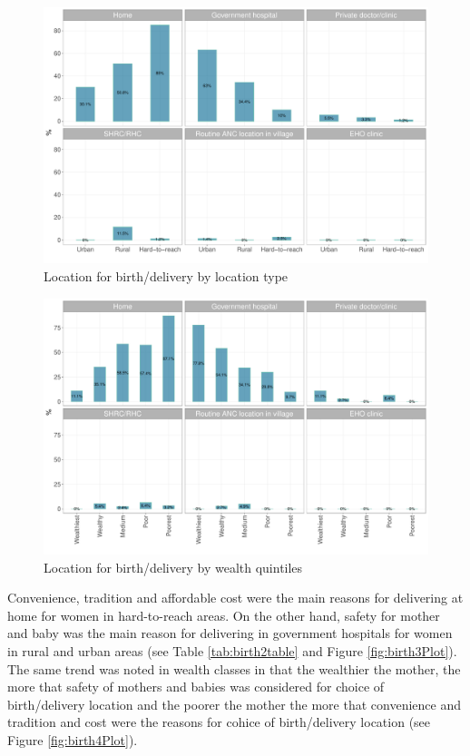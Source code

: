 \documentclass[12pt,a4paper]{article}
\begin{document}
\begin{figure}[H]

{\centering \includegraphics{kayinReport_files/figure-latex/birth1Plot-1} 

}

\caption{Location for birth/delivery by location type}\label{fig:birth1Plot}
\end{figure}

\begin{figure}[H]

{\centering \includegraphics{kayinReport_files/figure-latex/birth2Plot-1} 

}

\caption{Location for birth/delivery by wealth quintiles}\label{fig:birth2Plot}
\end{figure}

Convenience, tradition and affordable cost were the main reasons for delivering at home for women in hard-to-reach areas. On the other hand, safety for mother and baby was the main reason for delivering in government hospitals for women in rural and urban areas (see Table \ref{tab:birth2table} and Figure \ref{fig:birth3Plot}). The same trend was noted in wealth classes in that the wealthier the mother, the more that safety of mothers and babies was considered for choice of birth/delivery location and the poorer the mother the more that convenience and tradition and cost were the reasons for cohice of birth/delivery location (see Figure \ref{fig:birth4Plot}).
\end{document}

